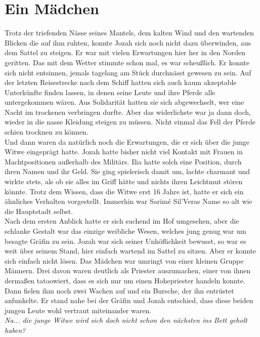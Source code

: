 \chapter{Ein Mädchen}

Trotz der triefenden Nässe seines Mantels, dem kalten Wind und den wartenden Blicken die auf ihm 
ruhten, konnte Jozah sich noch nicht dazu überwinden, aus dem Sattel zu steigen. Er war mit vielen 
Erwartungen hier her in den Norden geritten. Das mit dem Wetter stimmte schon mal, es war 
scheußlich. Er konnte sich nicht entsinnen, jemals tagelang am Stück durchnässt gewesen zu sein. Auf 
der letzten Reisestrecke nach dem Schiff hatten sich auch kaum akzeptable Unterkünfte finden lassen, 
in denen seine Leute und ihre Pferde alle untergekommen wären. Aus Solidarität hatten sie sich 
abgewechselt, wer eine Nacht im trockenen verbringen durfte. Aber das widerlichste war ja dann doch, 
wieder in die nasse Kleidung steigen zu müssen. Nicht einmal das Fell der Pferde schien trocknen zu 
können.\\
Und dann waren da natürlich noch die Erwartungen, die er sich über die junge Witwe eingeprägt 
hatte. Jozah hatte bisher nicht viel Kontakt mit Frauen in Machtpositionen außerhalb des Militärs. 
Ilia hatte solch eine Position, durch ihren Namen und ihr Geld. Sie ging spielerisch damit um, 
lachte charmant und wirkte stets, als ob sie alles im Griff hätte und nichts ihren Leichtmut stören 
könnte. Trotz dem Wissen, dass die Witwe erst 16 Jahre ist, hatte er sich ein ähnliches Verhalten 
vorgestellt. Immerhin war Sarimé Sil'Veras Name so alt wie die Hauptstadt selbst.\\
Nach dem ersten Anblick hatte er sich suchend im Hof umgesehen, aber die schlanke Gestalt war das 
einzige weibliche Wesen, welches jung genug war um besagte Gräfin zu sein. Jozah war sich seiner 
Unhöflichkeit bewusst, so war es weit über seinem Stand, hier einfach wartend im Sattel zu sitzen. 
Aber er konnte sich einfach nicht lösen. Das Mädchen war umringt von einer kleinen Gruppe Männern. 
Drei davon waren deutlich als Priester auszumachen, einer von ihnen dermaßen tatoowiert, dass es 
sich nur um einen Hohepriester handeln konnte. Dann fielen ihm noch zwei Wachen auf und ein 
Bursche, der ihn entrüstet anfunkelte. Er stand nahe bei der Gräfin und Jozah entschied, dass diese 
beiden jungen Leute wohl vertraut miteinander waren.\\
\textit{Na... die junge Witwe wird sich doch nicht schon den nächsten ins Bett geholt haben?}\\
